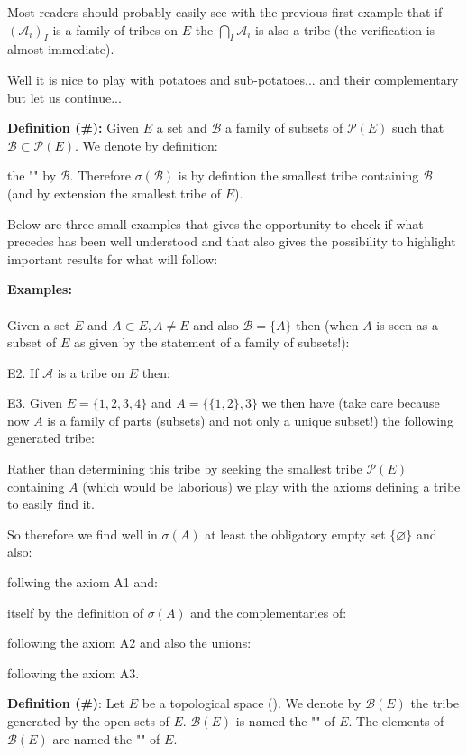 	\begin{tcolorbox}[title=Remark,colframe=black,arc=10pt]
	Most readers should probably easily see with the previous first example that if $(\mathcal{A}_i)_I$ is a family of tribes on $E$ the $\bigcap_I \mathcal{A}_i$ is also a tribe (the verification is almost immediate).
	\end{tcolorbox}	
	Well it is nice to play with potatoes and sub-potatoes... and their complementary but let us continue...
	
	\textbf{Definition (\#\mydef):} Given $E$ a set and $\mathcal{B}$ a family of subsets of $\mathcal{P}(E)$ such that $\mathcal{B}\subset \mathcal{P}(E)$. We denote by definition:
	
	the "" by $\mathcal{B}$. Therefore $\sigma(\mathcal{B})$ is by defintion the smallest tribe containing $\mathcal{B}$ (and by extension the smallest tribe of $E$).

	Below are three small examples that gives the opportunity to check if what precedes has been well understood and that also gives the possibility to highlight important results for what will follow:
	\begin{tcolorbox}[colframe=black,colback=white,sharp corners]
	\textbf{{\Large {}}Examples:}\\\\
	Given a set $E$ and $A\subset E,A \neq E$ and also $\mathcal{B}=\{A\}$ then (when $A$ is seen as a subset of $E$ as given by the statement of a family of subsets!):
	
	
	E2. If $\mathcal{A}$ is a tribe on $E$ then:
	

	E3. Given $E=\{1,2,3,4\}$ and $A=\{\{1,2\},{3}\}$ we then have (take care because now $A$ is a family of parts (subsets) and not only a unique subset!) the following generated tribe:
	
	Rather than determining this tribe by seeking the smallest tribe $\mathcal{P}(E)$ containing $A$ (which would be laborious) we play with the axioms defining a tribe to easily find it.
	
	So therefore we find well in $\sigma(A)$ at least the obligatory empty set $\{\varnothing\}$ and also:
	
	follwing the axiom A1 and:
	
	itself by the definition of $\sigma(A)$ and the complementaries of:
	
	following the axiom A2 and also the unions:
	
	following the axiom A3.
	\end{tcolorbox}
	\textbf{Definition (\#\mydef)}: Let $E$ be a topological space (). We denote by $\mathcal{B}(E)$ the tribe generated by the open sets of $E$. $\mathcal{B}(E)$ is named the "" of $E$. The elements of $\mathcal{B}(E)$ are named the "" of $E$. 
	
